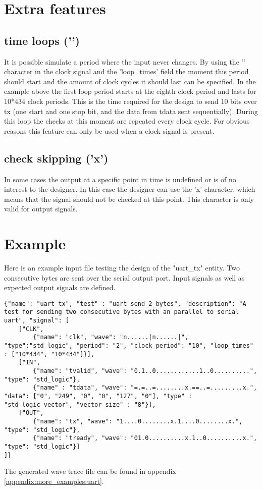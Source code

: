 \section{Extra features}
\subsection{time loops ('\textbar')}
It is possible simulate a period where the input never changes. By using the '\textbar' character in the clock signal and the 'loop\_times' field the moment this period should start and the amount of clock cycles it should last can be specified. In the example above the first loop period starts at the eighth clock period and lasts for 10*434 clock periods. This is the time required for the design to send 10 bits over tx (one start and one stop bit, and the data from tdata sent sequentially). During this loop the checks at this moment are repeated every clock cycle. For obvious reasons this feature can only be used when a clock signal is present.
\subsection{check skipping ('x')}
In some cases the output at a specific point in time is undefined or is of no interest to the designer. In this case the designer can use the 'x' character, which means that the signal should not be checked at this point. This character is only valid for output signals.\newpage
\section{Example}
Here is an example input file testing the design of the "uart\_tx" entity. Two consecutive bytes are sent over the serial output port. Input signals as well as expected output signals are defined.
\begin{lstlisting}[style=json, caption={}, label={}]
{"name": "uart_tx", "test" : "uart_send_2_bytes", "description": "A test for sending two consecutive bytes with an parallel to serial uart", "signal": [
	["CLK",
		{"name": "clk", "wave": "n......|n......|", "type":"std_logic", "period": "2", "clock_period": "10", "loop_times" : ["10*434", "10*434"]}],
	["IN",
		{"name": "tvalid", "wave": "0.1..0............1..0..........", "type": "std_logic"},
		{"name" : "tdata", "wave": "=.=..=........x.==..=.........x.", "data": ["0", "249", "0", "0", "127", "0"], "type" : "std_logic_vector", "vector_size" : "8"}],
	["OUT",
		{"name": "tx", "wave": "1....0........x.1....0........x.", "type": "std_logic"},
		{"name": "tready", "wave": "01.0..........x.1..0..........x.", "type": "std_logic"}]
]}
\end{lstlisting}
The generated wave trace file can be found in appendix \ref{appendix:more_examples:uart}.\newpage
\newpage
